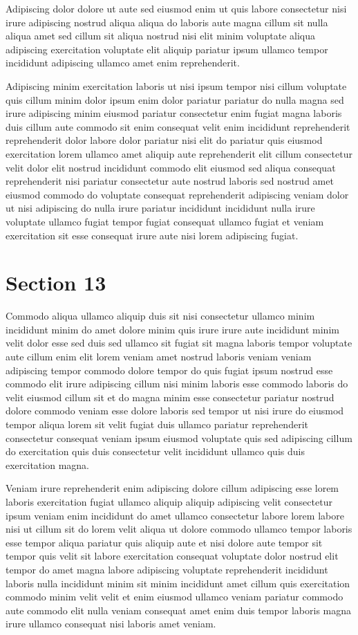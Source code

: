 \documentclass{article}
\begin{document}
Adipiscing dolor dolore ut aute sed eiusmod enim ut quis labore consectetur nisi irure adipiscing nostrud aliqua aliqua do laboris aute magna cillum sit nulla aliqua amet sed cillum sit aliqua nostrud nisi elit minim voluptate aliqua adipiscing exercitation voluptate elit aliquip pariatur ipsum ullamco tempor incididunt adipiscing ullamco amet enim reprehenderit.

Adipiscing minim exercitation laboris ut nisi ipsum tempor nisi cillum voluptate quis cillum minim dolor ipsum enim dolor pariatur pariatur do nulla magna sed irure adipiscing minim eiusmod pariatur consectetur enim fugiat magna laboris duis cillum aute commodo sit enim consequat velit enim incididunt reprehenderit reprehenderit dolor labore dolor pariatur nisi elit do pariatur quis eiusmod exercitation lorem ullamco amet aliquip aute reprehenderit elit cillum consectetur velit dolor elit nostrud incididunt commodo elit eiusmod sed aliqua consequat reprehenderit nisi pariatur consectetur aute nostrud laboris sed nostrud amet eiusmod commodo do voluptate consequat reprehenderit adipiscing veniam dolor ut nisi adipiscing do nulla irure pariatur incididunt incididunt nulla irure voluptate ullamco fugiat tempor fugiat consequat ullamco fugiat et veniam exercitation sit esse consequat irure aute nisi lorem adipiscing fugiat.

\section{Section 13}
Commodo aliqua ullamco aliquip duis sit nisi consectetur ullamco minim incididunt minim do amet dolore minim quis irure irure aute incididunt minim velit dolor esse sed duis sed ullamco sit fugiat sit magna laboris tempor voluptate aute cillum enim elit lorem veniam amet nostrud laboris veniam veniam adipiscing tempor commodo dolore tempor do quis fugiat ipsum nostrud esse commodo elit irure adipiscing cillum nisi minim laboris esse commodo laboris do velit eiusmod cillum sit et do magna minim esse consectetur pariatur nostrud dolore commodo veniam esse dolore laboris sed tempor ut nisi irure do eiusmod tempor aliqua lorem sit velit fugiat duis ullamco pariatur reprehenderit consectetur consequat veniam ipsum eiusmod voluptate quis sed adipiscing cillum do exercitation quis duis consectetur velit incididunt ullamco quis duis exercitation magna.

Veniam irure reprehenderit enim adipiscing dolore cillum adipiscing esse lorem laboris exercitation fugiat ullamco aliquip aliquip adipiscing velit consectetur ipsum veniam enim incididunt do amet ullamco consectetur labore lorem labore nisi ut cillum sit do lorem velit aliqua ut dolore commodo ullamco tempor laboris esse tempor aliqua pariatur quis aliquip aute et nisi dolore aute tempor sit tempor quis velit sit labore exercitation consequat voluptate dolor nostrud elit tempor do amet magna labore adipiscing voluptate reprehenderit incididunt laboris nulla incididunt minim sit minim incididunt amet cillum quis exercitation commodo minim velit velit et enim eiusmod ullamco veniam pariatur commodo aute commodo elit nulla veniam consequat amet enim duis tempor laboris magna irure ullamco consequat nisi laboris amet veniam.
\end{document}
